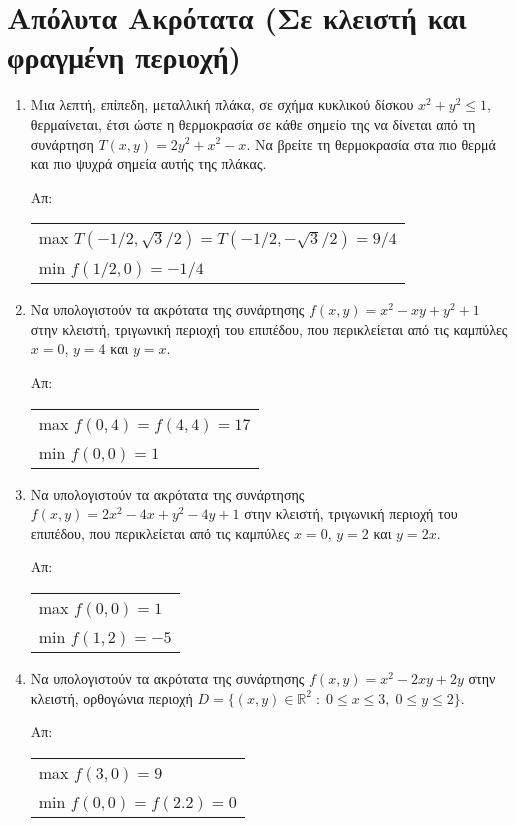 \documentclass[a4paper,table]{report}
\begin{document}
\section*{Απόλυτα Ακρότατα (Σε κλειστή και φραγμένη περιοχή)}

\begin{enumerate}
  \item Μια λεπτή, επίπεδη, μεταλλική πλάκα, σε σχήμα κυκλικού δίσκου 
    $ x^{2}+y^2 \leq 1 $, θερμαίνεται, έτσι ώστε η θερμοκρασία σε κάθε σημείο της να 
    δίνεται από τη συνάρτηση 
    $ T(x,y) = 2y^{2}+x^{2}-x $.
    Να βρείτε τη θερμοκρασία στα πιο θερμά και πιο ψυχρά σημεία αυτής της πλάκας.

    \hfill Απ:  
    \begin{tabular}{l}
      max $ T(-1/2, \sqrt{3} /2) = T(-1/2, - \sqrt{3} /2) = 9/4 $ \\
      min $ f(1/2,0) = -1/4 $ 
    \end{tabular}

  \item Να υπολογιστούν τα ακρότατα της συνάρτησης $ f(x,y) = x^{2}-xy+y^{2}+1 $ 
    στην κλειστή, τριγωνική περιοχή του επιπέδου, που περικλείεται από τις καμπύλες 
    $ x=0 $, $ y=4 $ και $ y=x $.

    \hfill Απ:  
    \begin{tabular}{l}
      max $ f(0,4) = f(4,4) = 17 $ \\
      min $ f(0,0) = 1 $ 
    \end{tabular}

  \item Να υπολογιστούν τα ακρότατα της συνάρτησης $ f(x,y) = 2x^{2}-4x+y^{2}-4y+1 $ 
    στην κλειστή, τριγωνική περιοχή του επιπέδου, που περικλείεται από τις καμπύλες 
    $ x=0 $, $ y=2 $ και $ y=2x $.

    \hfill Απ:  
    \begin{tabular}{l}
      max $ f(0,0) = 1 $ \\
      min $ f(1,2) = -5 $ 
    \end{tabular}

  \item Να υπολογιστούν τα ακρότατα της συνάρτησης $ f(x,y) = x^{2}-2xy+2y $ 
    στην κλειστή, ορθογώνια περιοχή $ D = \{ (x,y) \in \mathbb{R}^{2} \; : \; 0 \leq x
    \leq 3, \; 0 \leq y \leq 2 \} $.

    \hfill Απ:  
    \begin{tabular}{l}
      max $ f(3,0) = 9 $ \\
      min $ f(0,0) = f(2.2) = 0 $ 
    \end{tabular}
\end{enumerate}
\end{document}
